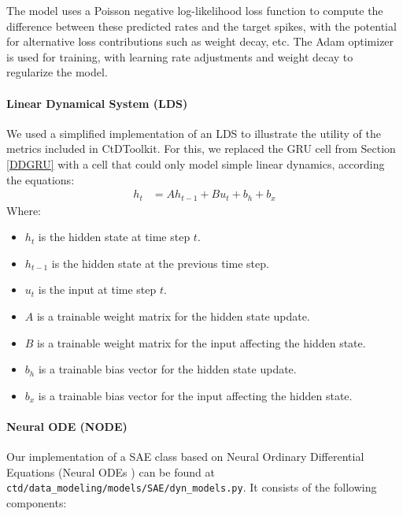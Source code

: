 \documentclass{article}
\begin{document}
The model uses a Poisson negative log-likelihood loss function to compute the difference between these predicted rates and the target spikes, with the potential for alternative loss contributions such as weight decay, etc. The Adam optimizer is used for training, with learning rate adjustments and weight decay to regularize the model.

\paragraph{Linear Dynamical System (LDS) \label{appendix:DD-LDS}}
We used a simplified implementation of an LDS to illustrate the utility of the metrics included in CtDToolkit. For this, we replaced the GRU cell from Section \ref{DDGRU} with a cell that could only model simple linear dynamics, according the equations:
\begin{align}
h_t &= A h_{t-1} + B u_t + b_h + b_x
\end{align}
Where:
\begin{itemize}
    \item \( h_t \) is the hidden state at time step \( t \).
    \item \( h_{t-1} \) is the hidden state at the previous time step.
    \item \( u_t \) is the input at time step \( t \).
    \item \( A \) is a trainable weight matrix for the hidden state update.
    \item \( B \) is a trainable weight matrix for the input affecting the hidden state.
    \item \( b_h \) is a trainable bias vector for the hidden state update.
    \item \( b_x \) is a trainable bias vector for the input affecting the hidden state.
\end{itemize}


\paragraph{Neural ODE (NODE)}
Our implementation of a SAE class based on Neural Ordinary Differential Equations (Neural ODEs \cite{chen_neural_2018}) can be found at \texttt{ctd/data\_modeling/models/SAE/dyn\_models.py}. It consists of the following components:
\end{document}

